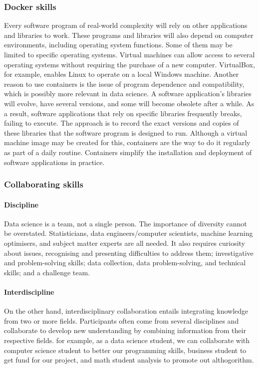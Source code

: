 \documentclass[a4paper, 11pt]{report}
\begin{document}
\subsubsection{Docker skills}
Every software program of real-world complexity will rely on other applications and libraries to work. These programs and libraries will also depend on computer environments, including operating system functions. Some of them may be limited to specific operating systems. Virtual machines can allow access to several operating systems without requiring the purchase of a new computer. VirtualBox, for example, enables Linux to operate on a local Windows machine. Another reason to use containers is the issue of program dependence and compatibility, which is possibly more relevant in data science. A software application's libraries will evolve, have several versions, and some will become obsolete after a while. As a result, software applications that rely on specific libraries frequently breaks, failing to execute. The approach is to record the exact versions and copies of these libraries that the software program is designed to run. Although a virtual machine image may be created for this, containers are the way to do it regularly as part of a daily routine. Containers simplify the installation and deployment of software applications in practice. \cite{(Pittard & Li, 2020)}\\
\subsubsection{Collaborating skills}
\paragraph{Discipline}
Data science is a team, not a single person. The importance of diversity cannot be overstated. Statisticians, data engineers/computer scientists, machine learning optimisers, and subject matter experts are all needed. It also requires curiosity about issues, recognising and presenting difficulties to address them; investigative and problem-solving skills; data collection, data problem-solving, and technical skills; and a challenge team. \cite{(MacGillivray, 2019)}\\
\paragraph{Interdiscipline}
On the other hand, interdisciplinary collaboration entails integrating knowledge from two or more fields. Participants often come from several disciplines and collaborate to develop new understanding by combining information from their respective fields. \cite{(Blaise Cronin, American Society For Information Science And Technology, and Information Today, Inc, 2007)} for example, as a data science student, we can collaborate with computer science student to better our programming skills, business student to get fund for our project, and math student analysis to promote out althogorithm.\\
\end{document}
